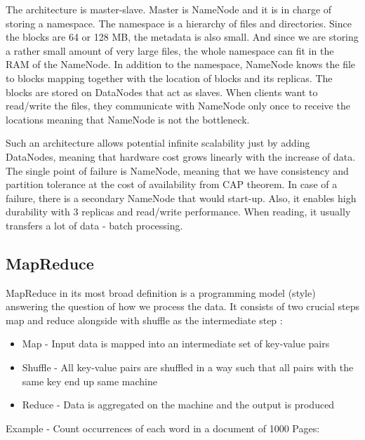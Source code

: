 The architecture is master-slave. Master is NameNode and it is in charge of storing a namespace. The namespace is a hierarchy of files and directories. Since the blocks are 64 or 128 MB, the metadata is also small. And since we are storing a rather small amount of very large files, the whole namespace can fit in the RAM of the NameNode. In addition to the namespace, NameNode knows the file to blocks mapping together with the location of blocks and its replicas. The blocks are stored on DataNodes that act as slaves. When clients want to read/write the files, they communicate with NameNode only once to receive the locations meaning that NameNode is not the bottleneck. 

Such an architecture allows potential infinite scalability just by adding DataNodes, meaning that hardware cost grows linearly with the increase of data. The single point of failure is NameNode, meaning that we have consistency and partition tolerance at the cost of availability from CAP theorem. In case of a failure, there is a secondary NameNode that would start-up. Also, it enables high durability with 3 replicas and read/write performance. When reading, it usually transfers a lot of data - batch processing.

\subsection{MapReduce}
MapReduce \cite{MapReduce} in its most broad definition is a programming model (style) answering the question of how we process the data. It consists of two crucial steps map and reduce alongside with shuffle as the intermediate step \cite{BigDataCourse}: %
\begin{itemize}
	\item Map - Input data is mapped into an intermediate set of key-value pairs
	\item Shuffle - All key-value pairs are shuffled in a way such that all pairs with the same key end up same machine
	\item Reduce - Data is aggregated on the machine and the output is produced
\end{itemize}
Example - Count occurrences of each word in a document of 1000 Pages:

